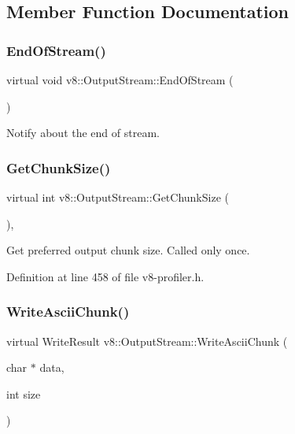 \subsection{Member Function Documentation}
\mbox{\label{classv8_1_1OutputStream_a6c5c308367fc5776bcbedff0e94d6049}} 
\subsubsection{\texorpdfstring{End\+Of\+Stream()}{EndOfStream()}}
{\footnotesize\ttfamily virtual void v8\+::\+Output\+Stream\+::\+End\+Of\+Stream (\begin{DoxyParamCaption}{ }\end{DoxyParamCaption})\hspace{0.3cm}{\ttfamily [pure virtual]}}

Notify about the end of stream. \mbox{\label{classv8_1_1OutputStream_a93bdaa790cbd66a7283fad2cca3f48f7}} 
\subsubsection{\texorpdfstring{Get\+Chunk\+Size()}{GetChunkSize()}}
{\footnotesize\ttfamily virtual int v8\+::\+Output\+Stream\+::\+Get\+Chunk\+Size (\begin{DoxyParamCaption}{ }\end{DoxyParamCaption})\hspace{0.3cm}{\ttfamily [inline]}, {\ttfamily [virtual]}}

Get preferred output chunk size. Called only once. 

Definition at line 458 of file v8-\/profiler.\+h.

\mbox{\label{classv8_1_1OutputStream_a42adc62ebe43d00159f80328538f217f}} 
\subsubsection{\texorpdfstring{Write\+Ascii\+Chunk()}{WriteAsciiChunk()}}
{\footnotesize\ttfamily virtual Write\+Result v8\+::\+Output\+Stream\+::\+Write\+Ascii\+Chunk (\begin{DoxyParamCaption}\item[{char $\ast$}]{data,  }\item[{int}]{size }\end{DoxyParamCaption})\hspace{0.3cm}{\ttfamily [pure virtual]}}

